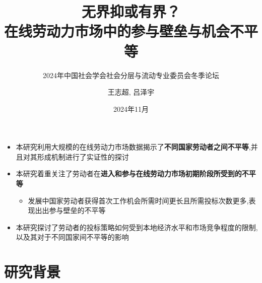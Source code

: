 \documentclass{beamer}
\title{\textbf{无界抑或有界？\\在线劳动力市场中的参与壁垒与机会不平等}}
\subtitle{2024年中国社会学会社会分层与流动专业委员会冬季论坛}
\author{ \textsc{王志超}, \textsc{吕泽宇}}
\institute{%
    \textit{日本東北大学}\\
    \textit{文学研究科 \hspace{0.2cm}  计算人文社会学专攻}}
\date{2024年11月}
\newcommand{\boldcolor}[1]{\textbf{\textcolor{custompurple}{#1}}}
\begin{document}
    \maketitle

    \begin{frame}

    \begin{itemize}
        \item 本研究利用大规模的在线劳动力市场数据揭示了\boldcolor{不同国家劳动者之间不平等},并且对其形成机制进行了实证性的探讨
        \item 本研究着重关注了劳动者在\boldcolor{进入和参与在线劳动力市场初期阶段所受到的不平等}
        \begin{itemize}
            \item 发展中国家劳动者获得首次工作机会所需时间更长且所需投标次数更多,表现出出参与壁垒的不平等
        \end{itemize}
        \item 本研究探讨了劳动者的投标策略如何受到本地经济水平和市场竞争程度的限制,以及其对于不同国家间不平等的影响
    \end{itemize}

    \end{frame}

    \section{研究背景}
\end{document}
